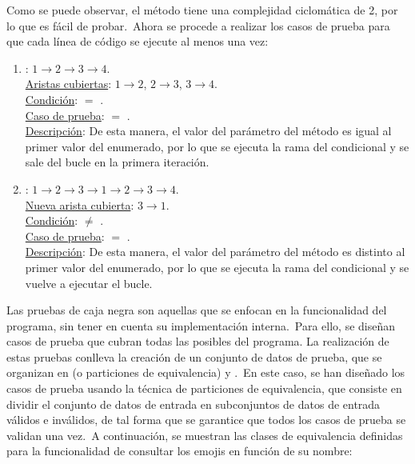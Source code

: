 Como se puede observar, el método tiene una complejidad ciclomática de 2, por lo que es fácil de probar.\ Ahora se
procede a realizar los casos de prueba para que cada línea de código se ejecute al menos una vez:

\begin{enumerate}
	\item {}: $1 \rightarrow 2 \rightarrow 3 \rightarrow 4$.
	\\
	\underline{Aristas cubiertas}: $1 \rightarrow 2$, $2 \rightarrow 3$, $3 \rightarrow 4$.\\
	\underline{Condición}:  $=$ .\\
	\underline{Caso de prueba}:  $=$ .\\
	\underline{Descripción}:
	De esta manera, el valor del parámetro del método es igual al primer valor del enumerado,
	por lo que se ejecuta la rama  del condicional y se sale del bucle en la primera iteración.

	\item {}: $1 \rightarrow 2 \rightarrow 3 \rightarrow 1 \rightarrow 2 \rightarrow 3 \rightarrow 4$.
	\\
	\underline{Nueva arista cubierta}: $3 \rightarrow 1$.\\
	\underline{Condición}:  $\neq$ .\\
	\underline{Caso de prueba}:  $=$ .\\
	\underline{Descripción}:
	De esta manera, el valor del parámetro del método es distinto al primer valor del
	enumerado, por lo que se ejecuta la rama  del condicional y se vuelve a ejecutar el bucle.
\end{enumerate}
\label{itm:casos-prueba-pruebas-unitarias-caja-blanca}


Las pruebas de caja negra son aquellas que se enfocan en la funcionalidad del programa, sin tener en cuenta su
implementación interna.\ Para ello, se diseñan casos de prueba que cubran todas las posibles
 del programa.
La realización de estas pruebas conlleva la creación de un conjunto de datos de prueba, que se
organizan en  (o particiones de equivalencia) y
.\ En este caso, se han diseñado los casos de
prueba usando la técnica de particiones de equivalencia, que consiste en dividir el conjunto de datos de entrada en
subconjuntos de datos de entrada válidos e inválidos, de tal forma que se garantice que todos los casos de prueba
se validan una vez.\ A continuación, se muestran las clases de equivalencia definidas para la funcionalidad de
consultar los emojis en función de su nombre:

